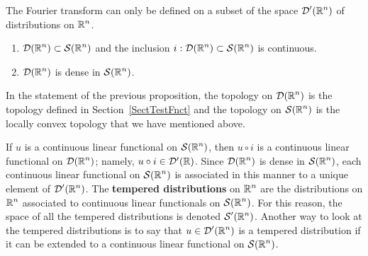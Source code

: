 The Fourier transform can only be defined on a subset of the space
$\displaystyle \mathcal{D}'(\mathbb{R}^n)$ of distributions on $\displaystyle \mathbb{R}^n$.

\begin{prop} \label{DD_S_IncDense}
\begin{enumerate}
\item $\displaystyle \mathcal{D}(\mathbb{R}^n) \subset \mathcal{S}(\mathbb{R}^n)$ and the inclusion
$\displaystyle i:\mathcal{D}(\mathbb{R}^n) \subset \mathcal{S}(\mathbb{R}^n)$ is continuous.
\item $\displaystyle \mathcal{D}(\mathbb{R}^n)$ is dense in $\displaystyle \mathcal{S}(\mathbb{R}^n)$.
\end{enumerate}
\end{prop}

In the statement of the previous proposition, the topology on
$\displaystyle \mathcal{D}(\mathbb{R}^n)$ is the topology defined in
Section~\ref{SectTestFnct} and the topology on
$\displaystyle \mathcal{S}(\mathbb{R}^n)$ is the locally convex topology that we
have mentioned above.

If $u$ is a continuous linear functional on $\displaystyle \mathcal{S}(\mathbb{R}^n)$, then
$u \circ i$ is a continuous linear functional on
$\displaystyle \mathcal{D}(\mathbb{R}^n)$; namely,
$u\circ i \in \mathcal{D}'(\mathbb{R})$.  Since $\displaystyle \mathcal{D}(\mathbb{R}^n)$ is dense in
$\displaystyle \mathcal{S}(\mathbb{R}^n)$, each continuous linear functional on
$\displaystyle \mathcal{S}(\mathbb{R}^n)$ is associated in this manner to a unique
element of $\displaystyle \mathcal{D}'(\mathbb{R}^n)$.
The {\bfseries tempered distributions}
on $\displaystyle \mathbb{R}^n$ are the distributions on $\displaystyle \mathbb{R}^n$
associated to continuous linear functionals on
$\displaystyle \mathcal{S}(\mathbb{R}^n)$.  For this reason, the space of all the tempered
distributions is denoted $\displaystyle \mathcal{S}'(\mathbb{R}^n)$.  Another way to
look at the tempered distributions is to say that
$\displaystyle u \in \mathcal{D}'(\mathbb{R}^n)$ is a
tempered distribution if it can be extended to a continuous linear
functional on $\displaystyle \mathcal{S}(\mathbb{R}^n)$.

